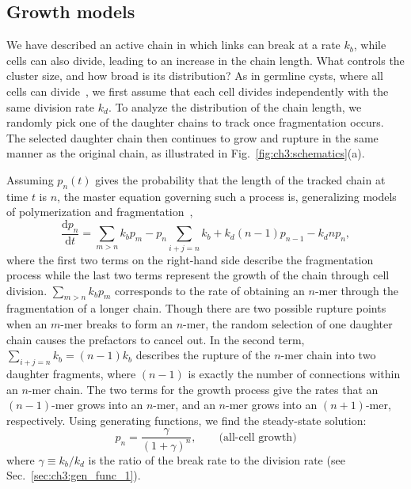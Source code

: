 \subsection{Growth models}
\label{sec:ch3:growth_model}

We have described an active chain in which links can break at a rate $k_b$, while cells can also divide, leading to an increase in the chain length. What controls the cluster size, and how broad is its distribution? As in germline cysts, where all cells can divide~\cite{levy2024tug}, we first assume that each cell divides independently with the same division rate $k_d$. To analyze the distribution of the chain length, we randomly pick one of the daughter chains to track once fragmentation occurs. The selected daughter chain then continues to grow and rupture in the same manner as the original chain, as illustrated in Fig.~\ref{fig:ch3:schematics}(a).

Assuming $p_n(t)$ gives the probability that the length of the tracked chain at time $t$ is $n$, the master equation governing such a process is, generalizing models of polymerization and fragmentation~\cite{krapivsky2010kinetic},
\begin{equation}\label{eq:ch3:master_all}
    \frac{\mathrm{d} p_n}{\mathrm{d} t}=\sum_{m>n} k_b p_{m} -p_n\sum_{i+j=n}k_b+k_d(n-1)p_{n-1}-k_dnp_n,
\end{equation}
where the first two terms on the right-hand side describe the fragmentation process while the last two terms represent the growth of the chain through cell division. $\sum_{m>n} k_b p_{m}$ corresponds to the rate of obtaining an $n$-mer through the fragmentation of a longer chain. Though there are two possible rupture points when an $m$-mer breaks to form an $n$-mer, the random selection of one daughter chain causes the prefactors to cancel out. In the second term, $\sum_{i+j=n}k_b = (n-1)k_b$ describes the rupture of the $n$-mer chain into two daughter fragments, where $(n-1)$ is exactly the number of connections within an $n$-mer chain. The two terms for the growth process give the rates that an $(n-1)$-mer grows into an $n$-mer, and an $n$-mer grows into an $(n+1)$-mer, respectively. Using generating functions, we find the steady-state solution:
\begin{equation}\label{eq:ch3:ss_solution_all}
    p_n=\frac{\gamma}{(1+\gamma)^n},\qquad\textrm{(all-cell growth)}
\end{equation}
where $\gamma \equiv k_b/k_d$ is the ratio of the break rate to the division rate (see Sec.~\ref{sec:ch3:gen_func_1}).


